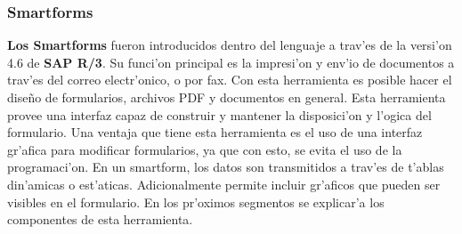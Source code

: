 \subsubsection{Smartforms}
	\textbf{Los Smartforms} fueron introducidos dentro del lenguaje a trav'es de la versi'on 4.6 de \textbf{SAP R/3}. Su funci'on principal es la impresi'on y env'io de documentos a trav'es del correo electr'onico, o por fax. 
	Con esta herramienta es posible hacer el dise\~no de formularios, archivos PDF y documentos en general. 
	Esta herramienta provee una interfaz capaz de construir y mantener la disposici'on y l'ogica del formulario.
	Una ventaja que tiene esta herramienta es el uso  de una interfaz gr'afica para modificar formularios, ya que con esto, se evita el uso de la programaci'on. 
	En un smartform, los datos son transmitidos a trav'es de t'ablas din'amicas o est'aticas. Adicionalmente permite incluir gr'aficos que pueden ser visibles en el formulario. En los pr'oximos segmentos se explicar'a los componentes de esta herramienta.
